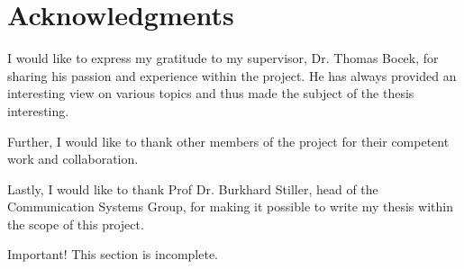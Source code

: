 \chapter*{Acknowledgments}

I would like to express my gratitude to my supervisor, Dr. Thomas Bocek, for sharing his passion and experience within the project. He has always provided an interesting view on various topics and thus made the subject of the thesis interesting.

Further, I would like to thank other members of the project for their competent work and collaboration.

Lastly, I would like to thank Prof Dr. Burkhard Stiller, head of the Communication Systems Group, for making it possible to write my thesis within the scope of this project.

\begin{bclogo}[logo=\bcattention, couleurBarre=red, noborder=true, 
               couleur=LightSalmon]{Important!}
This section is incomplete.
\end{bclogo}